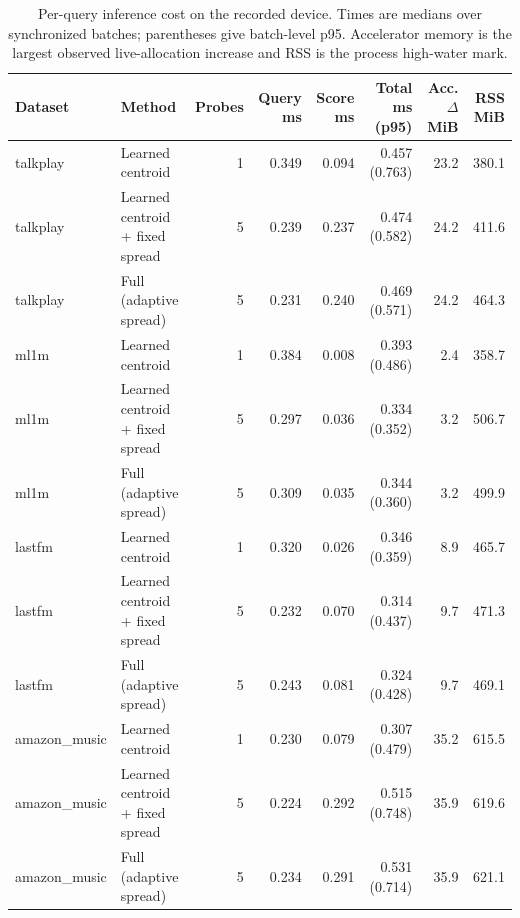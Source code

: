 \begin{table}[t]
\centering\scriptsize
\begin{tabular}{llrrrrrr}
\toprule
Dataset & Method & Probes & Query ms & Score ms & Total ms (p95) & Acc. $\Delta$ MiB & RSS MiB \\
\midrule
talkplay & Learned centroid & 1 & 0.349 & 0.094 & 0.457 (0.763) & 23.2 & 380.1 \\
talkplay & Learned centroid + fixed spread & 5 & 0.239 & 0.237 & 0.474 (0.582) & 24.2 & 411.6 \\
talkplay & Full (adaptive spread) & 5 & 0.231 & 0.240 & 0.469 (0.571) & 24.2 & 464.3 \\
ml1m & Learned centroid & 1 & 0.384 & 0.008 & 0.393 (0.486) & 2.4 & 358.7 \\
ml1m & Learned centroid + fixed spread & 5 & 0.297 & 0.036 & 0.334 (0.352) & 3.2 & 506.7 \\
ml1m & Full (adaptive spread) & 5 & 0.309 & 0.035 & 0.344 (0.360) & 3.2 & 499.9 \\
lastfm & Learned centroid & 1 & 0.320 & 0.026 & 0.346 (0.359) & 8.9 & 465.7 \\
lastfm & Learned centroid + fixed spread & 5 & 0.232 & 0.070 & 0.314 (0.437) & 9.7 & 471.3 \\
lastfm & Full (adaptive spread) & 5 & 0.243 & 0.081 & 0.324 (0.428) & 9.7 & 469.1 \\
amazon\_music & Learned centroid & 1 & 0.230 & 0.079 & 0.307 (0.479) & 35.2 & 615.5 \\
amazon\_music & Learned centroid + fixed spread & 5 & 0.224 & 0.292 & 0.515 (0.748) & 35.9 & 619.6 \\
amazon\_music & Full (adaptive spread) & 5 & 0.234 & 0.291 & 0.531 (0.714) & 35.9 & 621.1 \\
\bottomrule
\end{tabular}
\caption{Per-query inference cost on the recorded device. Times are medians over synchronized batches; parentheses give batch-level p95. Accelerator memory is the largest observed live-allocation increase and RSS is the process high-water mark.}
\label{tab:ecir-efficiency}
\end{table}
